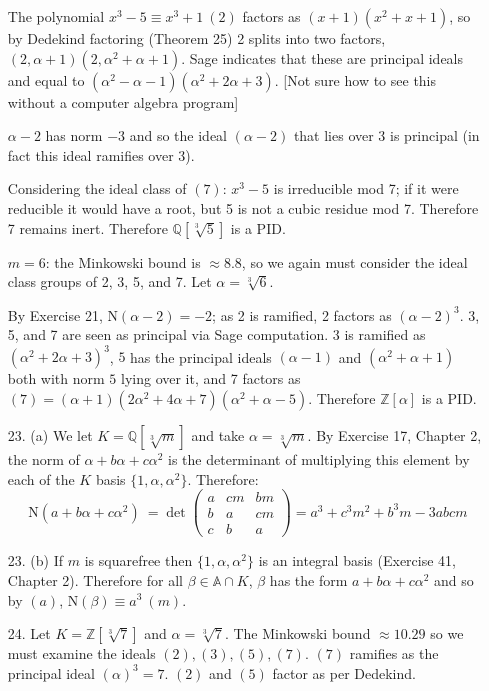 \documentclass{article}
\newcommand{\Q}[0]{\mathbb{Q}}
\newcommand{\Z}[0]{\mathbb{Z}}
\newcommand{\norm}[0]{\text{N}}
\newcommand{\modequiv}[3]{#1 \equiv #2\ (#3)}
\newcommand{\ringofintegers}[1]{\mathbb{A} \cap #1}
\begin{document}
\begin{enumerate}
    The polynomial $\modequiv{x^3 - 5}{x^3 + 1}{2}$ factors as $(x + 1)(x^2 + x + 1)$, so by Dedekind factoring (Theorem 25) 2 splits into two factors, $(2, \alpha + 1)(2, \alpha^2 + \alpha + 1)$.  Sage indicates that these are principal ideals and equal to $(\alpha^2 - \alpha - 1)(\alpha^2 + 2\alpha + 3)$.  [Not sure how to see this without a computer algebra program]

    $\alpha - 2$ has norm $-3$ and so the ideal $(\alpha - 2)$ that lies over 3 is principal (in fact this ideal ramifies over 3).

    Considering the ideal class of $(7)$: $x^3 - 5$ is irreducible mod 7; if it were reducible it would have a root, but 5 is not a cubic residue mod 7.  Therefore 7 remains inert.  Therefore $\Q[\sqrt[3]{5}]$ is a PID.

    $m = 6$: the Minkowski bound is $\approx 8.8$, so we again must consider the ideal class groups of 2, 3, 5, and 7.  Let $\alpha = \sqrt[3]{6}$.

    By Exercise 21, $\norm(\alpha - 2) = -2$; as 2 is ramified, 2 factors as $(\alpha - 2)^3$.  3, 5, and 7 are seen as principal via Sage computation.  $3$ is ramified as $(\alpha^2 + 2\alpha +3)^3$, $5$ has the principal ideals $(\alpha -1)$ and $(\alpha^2 + \alpha + 1)$ both with norm $5$ lying over it, and 7 factors as $(7) = (\alpha + 1)(2\alpha^2 + 4\alpha + 7)(\alpha^2 + \alpha - 5)$.  Therefore $\Z[\alpha]$ is a PID.

    \item[23. (a)] We let $K = \Q[\sqrt[3]{m}]$ and take $\alpha = \sqrt[3]{m}$.  By Exercise 17, Chapter 2, the norm of $\alpha + b\alpha + c\alpha^2$ is the determinant of multiplying this element by each of the $K$ basis $\{1, \alpha, \alpha^2\}$.  Therefore:
    \[
        \norm(a + b\alpha + c\alpha^2)\ =\det\left(
        \begin{matrix}
            a & cm &bm \\
            b & a & cm \\
            c & b & a
        \end{matrix}\right) = a^3 + c^3 m^2 + b^3 m - 3abcm
    \]
    \item[23. (b)] If $m$ is squarefree then $\{1, \alpha, \alpha^2\}$ is an integral basis (Exercise 41, Chapter 2).  Therefore for all $\beta \in \ringofintegers{K}$, $\beta$ has the form $a + b\alpha  + c\alpha^2$ and so by $(a)$, $\modequiv{\norm(\beta)}{a^3}{m}$.

    \item[24.]  Let $K = \Z[\sqrt[3]{7}]$ and $\alpha = \sqrt[3]{7}$.  The Minkowski bound $\approx 10.29$ so we must examine the ideals $(2), (3), (5), (7)$.  $(7)$ ramifies as the principal ideal $(\alpha)^3 = 7$.  $(2)$ and $(5)$ factor as per Dedekind.


\end{enumerate}
\end{document}

